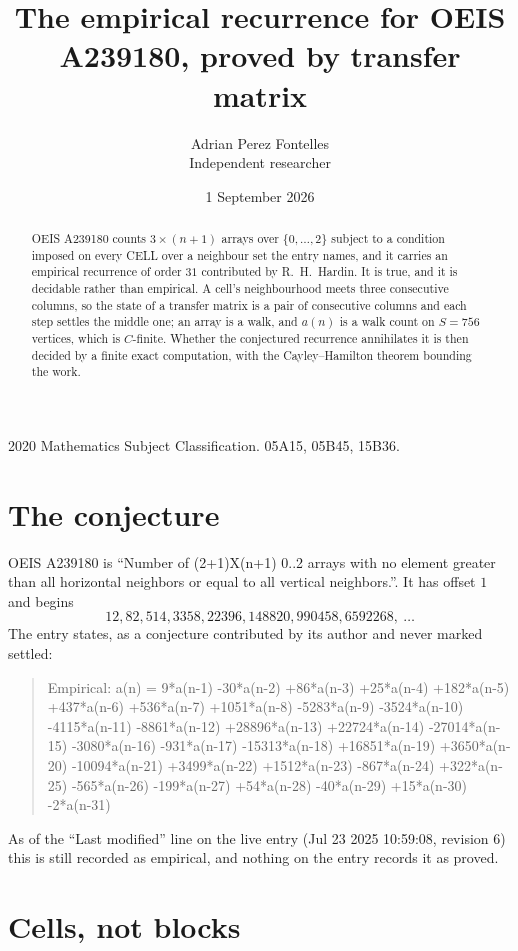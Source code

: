 \documentclass[11pt,a4paper]{article}
\title{The empirical recurrence for OEIS A239180, proved by transfer matrix}
\author{Adrian Perez Fontelles\\ \small Independent researcher}
\date{1 September 2026}
\theoremstyle{plain}
\theoremstyle{definition}
\begin{document}
\maketitle

\begin{abstract}
OEIS A239180 counts $3\times(n+1)$ arrays over $\{0,\dots,2\}$ subject to a condition imposed on
every CELL over a neighbour set the entry names, and it carries an empirical recurrence of
order $31$ contributed by R.~H.~Hardin. It is true, and it is decidable rather than
empirical. A cell's neighbourhood meets three consecutive columns, so the state of a transfer
matrix is a pair of consecutive columns and each step settles the middle one; an array is a
walk, and $a(n)$ is a walk count on $S=756$ vertices, which is $C$-finite. Whether the
conjectured recurrence annihilates it is then decided by a finite exact computation, with the
Cayley--Hamilton theorem bounding the work.
\end{abstract}

\noindent\small 2020 Mathematics Subject Classification. 05A15, 05B45, 15B36.\normalsize

\section{The conjecture}

OEIS A239180 is ``Number of (2+1)X(n+1) 0..2 arrays with no element greater than all horizontal neighbors or equal to all vertical neighbors.''. It has offset $1$ and begins
\[
12, 82, 514, 3358, 22396, 148820, 990458, 6592268,\ \dots
\]
The entry states, as a conjecture contributed by its author and never marked settled:
\begin{quote}
Empirical: a(n) = 9*a(n-1) -30*a(n-2) +86*a(n-3) +25*a(n-4) +182*a(n-5) +437*a(n-6) +536*a(n-7) +1051*a(n-8) -5283*a(n-9) -3524*a(n-10) -4115*a(n-11) -8861*a(n-12) +28896*a(n-13) +22724*a(n-14) -27014*a(n-15) -3080*a(n-16) -931*a(n-17) -15313*a(n-18) +16851*a(n-19) +3650*a(n-20) -10094*a(n-21) +3499*a(n-22) +1512*a(n-23) -867*a(n-24) +322*a(n-25) -565*a(n-26) -199*a(n-27) +54*a(n-28) -40*a(n-29) +15*a(n-30) -2*a(n-31)
\end{quote}
As of the ``Last modified'' line on the live entry (Jul 23 2025 10:59:08, revision 6) this is still
recorded as empirical, and nothing on the entry records it as proved.

\section{Cells, not blocks}
\end{document}
